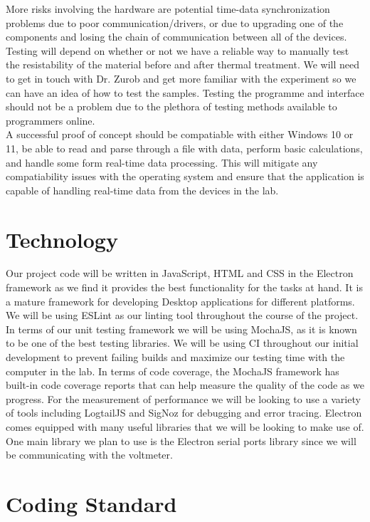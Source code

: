 \documentclass{article}
\begin{document}
\noindent More risks involving the hardware are potential time-data synchronization problems due to poor communication/drivers, or due to upgrading one of the components and losing the chain of communication between all of the devices. 
Testing will depend on whether or not we have a reliable way to manually test the resistability of the material before and after thermal treatment. We will need to get in touch with Dr. Zurob and get more familiar with the experiment so we can have an idea of how to test the samples. Testing the programme and interface should not be a problem due to the plethora of testing methods available to programmers online. \\

\noindent A successful proof of concept should be compatiable with either Windows 10 or 11, 
be able to read and parse through a file with data, perform basic calculations, and handle some form real-time data processing. 
This will mitigate any compatiability issues with the operating system and ensure that the application is capable of handling real-time data from the devices in the lab.

\section{Technology}


Our project code will be written in JavaScript, HTML and CSS in the Electron framework as 
we find it provides the best functionality for the tasks at hand. It is a mature framework for developing Desktop applications for different platforms.
We will be using ESLint as our linting tool throughout the course of the project. In terms of our unit testing 
framework we will be using MochaJS, as it is known to be one of the best testing libraries. 
We will be using CI throughout our initial development to prevent failing builds and maximize our testing time with the computer in the lab. In terms of code coverage, the MochaJS 
framework has built-in code coverage reports that can help measure the quality of the code as we progress. For the
measurement of performance we will be looking to use a variety of tools including LogtailJS and SigNoz 
for debugging and error tracing. Electron comes equipped with many useful libraries that we 
will be looking to make use of. One main library we plan to use is the Electron serial ports library since we will be communicating with the voltmeter.
  
\section{Coding Standard}
  
\end{document}
